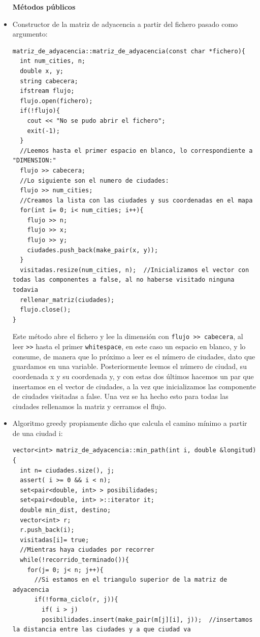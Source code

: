 \documentclass[12pt]{article}
\begin{document}
\begin{itemize}[wide, nosep, labelindent = 0pt, topsep = 1ex]
\item[\textbf{Métodos públicos}] 
\item Constructor de la matriz de adyacencia a partir del fichero pasado como argumento: 
\begin{lstlisting}
matriz_de_adyacencia::matriz_de_adyacencia(const char *fichero){
  int num_cities, n;
  double x, y;
  string cabecera;
  ifstream flujo;
  flujo.open(fichero);
  if(!flujo){
    cout << "No se pudo abrir el fichero";
    exit(-1);
  }
  //Leemos hasta el primer espacio en blanco, lo correspondiente a "DIMENSION:"
  flujo >> cabecera;
  //Lo siguiente son el numero de ciudades:
  flujo >> num_cities;
  //Creamos la lista con las ciudades y sus coordenadas en el mapa
  for(int i= 0; i< num_cities; i++){
    flujo >> n;
    flujo >> x;
    flujo >> y;
    ciudades.push_back(make_pair(x, y));
  }
  visitadas.resize(num_cities, n);	//Inicializamos el vector con todas las componentes a false, al no haberse visitado ninguna todavia
  rellenar_matriz(ciudades);
  flujo.close();
}
\end{lstlisting}
Este método abre el fichero y lee la dimensión con \verb|flujo >> cabecera|, al leer \verb|>>| hasta el primer \verb|whitespace|, en este caso un espacio en blanco, y lo consume, de manera que lo próximo a leer es el número de ciudades, dato que guardamos en una variable. Posteriormente leemos el número de ciudad, su coordenada x y su coordenada y, y con estas dos últimos hacemos un par que insertamos en el vector de ciudades, a la vez que inicializamos las componente de ciudades visitadas a false. Una vez se ha hecho esto para todas las ciudades rellenamos la matriz y cerramos el flujo.
\item Algoritmo greedy propiamente dicho que calcula el camino mínimo a partir de una ciudad i: 
\begin{lstlisting}
vector<int> matriz_de_adyacencia::min_path(int i, double &longitud){
  int n= ciudades.size(), j;
  assert( i >= 0 && i < n);
  set<pair<double, int> > posibilidades;
  set<pair<double, int> >::iterator it;
  double min_dist, destino;
  vector<int> r;
  r.push_back(i);
  visitadas[i]= true;
  //Mientras haya ciudades por recorrer
  while(!recorrido_terminado()){
    for(j= 0; j< n; j++){
      //Si estamos en el triangulo superior de la matriz de adyacencia
      if(!forma_ciclo(r, j)){
        if( i > j)
        posibilidades.insert(make_pair(m[j][i], j));  //insertamos la distancia entre las ciudades y a que ciudad va

\end{lstlisting}
\end{itemize}
\end{document}
